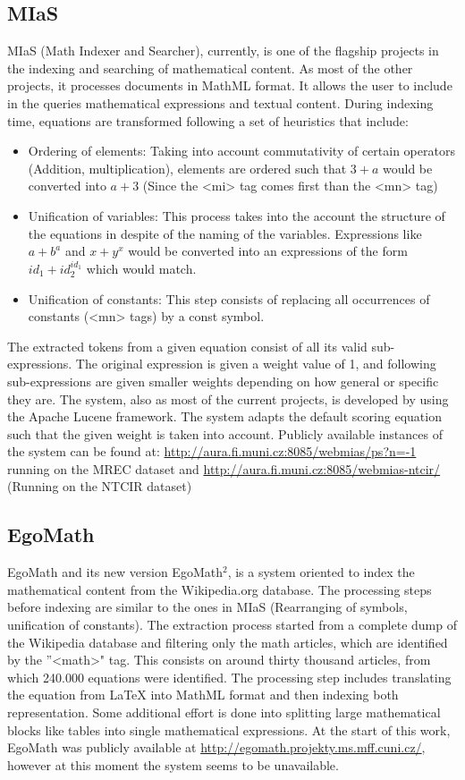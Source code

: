 \subsection{MIaS}
MIaS\cite{mias_1} (Math Indexer and Searcher), currently, is one of the flagship projects in the indexing and searching of mathematical content. As most of the other projects, it processes documents in MathML format. It allows the user to include in the queries mathematical expressions and textual content. During indexing time, equations are transformed following a set of heuristics that include:
\begin{itemize}
  \item Ordering of elements: Taking into account commutativity of certain operators (Addition, multiplication), elements are ordered such that $3 + a$ would be converted into $a + 3$ (Since the <mi> tag comes first than the <mn> tag)
  \item Unification of variables: This process takes into the account the structure of the equations in despite of the naming of the variables. Expressions like $a+b^a$ and $x+y^x$ would be converted into an expressions of the form $id_1 + id_2^{id_1}$ which would match.
  \item Unification of constants: This step consists of replacing all occurrences of constants (<mn> tags) by a const symbol. 
\end{itemize}
The extracted tokens from a given equation consist of all its valid sub-expressions. The original expression is given a weight value of 1, and following sub-expressions are given smaller weights depending on how general or specific they are.  
The system, also as most of the current projects, is developed by using the Apache Lucene framework. The system adapts the default scoring equation such that the given weight is taken into account.  
Publicly available instances of the system can be found at: \url{http://aura.fi.muni.cz:8085/webmias/ps?n=-1} running on the MREC\cite{mrec} dataset and  \url{ http://aura.fi.muni.cz:8085/webmias-ntcir/} (Running on the NTCIR dataset)

\subsection{EgoMath}
EgoMath\cite{egomath1} and its new version EgoMath$^2$\cite{egomath2}, is a system oriented to index the mathematical content from the Wikipedia.org database. The processing steps before indexing are similar to the ones in MIaS (Rearranging of symbols, unification of constants). The extraction process started from a complete dump of the Wikipedia database and filtering only the math articles, which are identified by the ”<math>" tag. This consists on around thirty thousand articles, from which 240.000 equations were identified. The processing step includes translating the equation from LaTeX into MathML format and then indexing both representation.
Some additional effort is done into splitting large mathematical blocks like tables into single mathematical expressions. At the start of this work, EgoMath was publicly available at \url{http://egomath.projekty.ms.mff.cuni.cz/}, however at this moment the system seems to be unavailable.

